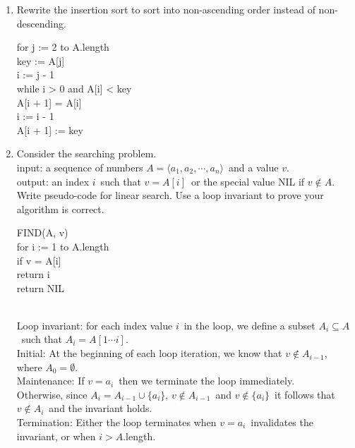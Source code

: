 \documentclass{article}
\newcommand{\Ve}[1]{\langle #1 \rangle}
\newcommand{\?}{\stackrel{?}{=}}
\newcommand\Ans[2][]{%
   \leavevmode\noindent
   {
       \begin{mdframed}[backgroundcolor=blue!10]
       #2
       \end{mdframed}
   }
}
\begin{document}
\begin{enumerate}
{	    
	}

	\item Rewrite the insertion sort to sort into non-ascending order instead of non-descending.
	\Ans{
		\setlength{\parindent}{5ex}
		\begin{tt}
		for j := 2 to A.length \\
		  \indent key := A[j] \\
		  \indent i := j - 1 \\
		  \indent while i > 0 and A[i] < key \\
		  \indent \indent A[i + 1] = A[i] \\
		  \indent \indent i := i - 1 \\
		  \indent A[i + 1] := key
		\end{tt}
	}
	\item Consider the searching problem. \\
	\setlength{\parindent}{10ex}
	        \indent input: a sequence of numbers $A = \Ve{a_1,a_2,\cdots,a_n}$\ and a value $v$. \\
	        \indent output: an index $i$\ such that $v=A[i]$\ or the special value NIL if $v \notin A$. \\
	 Write pseudo-code for linear search.  Use a loop invariant to prove your algorithm is correct.
	 \Ans{
	     \setlength{\parindent}{5ex}
	     \begin{tt}
	     	FIND(A, v) \\
	     	\indent for i := 1 to A.length \\
	     	\indent \indent if v = A[i] \\
	     	\indent \indent \indent return i \\
	     	\indent return NIL
	     \end{tt} \\
	     Loop invariant: for each index value $i$\ in the loop, we define a subset $A_i \subseteq A$\ such that $A_i = A[1\cdots i]$.  \\
	     Initial: At the beginning of each loop iteration, we know that $v \notin A_{i-1}$, where $A_0 = \emptyset$. \\
	     Maintenance: If $v=a_i$\ then we terminate the loop immediately. \\
	      Otherwise, since $A_i = A_{i-1} \cup \{a_i\}$, $v\notin A_{i-1}$\ and $v\notin \{a_i\}$\ it follows that $v \notin A_i$\ and the invariant holds.\\
	     Termination: Either the loop terminates when $v=a_i$\ invalidates the invariant, or when $i>A$.length.
	 }

\end{enumerate}
\end{document}
